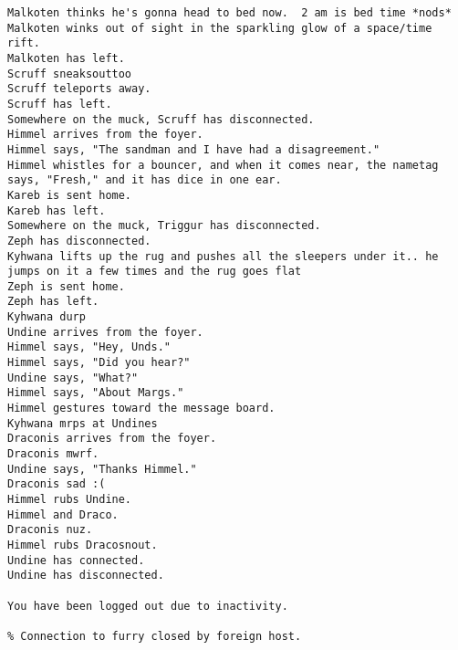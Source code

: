 \begin{verbatim}
Malkoten thinks he's gonna head to bed now.  2 am is bed time *nods*
Malkoten winks out of sight in the sparkling glow of a space/time rift.
Malkoten has left.
Scruff sneaksouttoo
Scruff teleports away.
Scruff has left.
Somewhere on the muck, Scruff has disconnected.
Himmel arrives from the foyer.
Himmel says, "The sandman and I have had a disagreement."
Himmel whistles for a bouncer, and when it comes near, the nametag says, "Fresh," and it has dice in one ear.
Kareb is sent home.
Kareb has left.
Somewhere on the muck, Triggur has disconnected.
Zeph has disconnected.
Kyhwana lifts up the rug and pushes all the sleepers under it.. he jumps on it a few times and the rug goes flat
Zeph is sent home.
Zeph has left.
Kyhwana durp
Undine arrives from the foyer.
Himmel says, "Hey, Unds."
Himmel says, "Did you hear?"
Undine says, "What?"
Himmel says, "About Margs."
Himmel gestures toward the message board.
Kyhwana mrps at Undines
Draconis arrives from the foyer.
Draconis mwrf.
Undine says, "Thanks Himmel."
Draconis sad :(
Himmel rubs Undine.
Himmel and Draco.
Draconis nuz.
Himmel rubs Dracosnout.
Undine has connected.
Undine has disconnected.

You have been logged out due to inactivity.

% Connection to furry closed by foreign host.
\end{verbatim}
